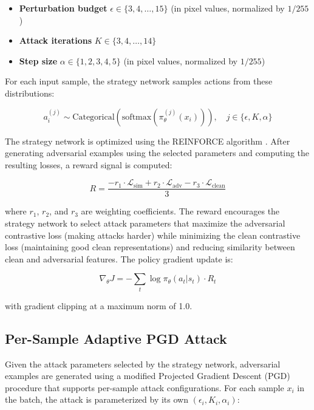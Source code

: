 \documentclass[conference]{IEEEtran}
\begin{document}
\begin{itemize}
    \item \textbf{Perturbation budget} $\epsilon \in \{3, 4, \ldots, 15\}$ (in pixel values, normalized by $1/255$)
    \item \textbf{Attack iterations} $K \in \{3, 4, \ldots, 14\}$
    \item \textbf{Step size} $\alpha \in \{1, 2, 3, 4, 5\}$ (in pixel values, normalized by $1/255$)
\end{itemize}

For each input sample, the strategy network samples actions from these distributions:

\begin{equation}
a_i^{(j)} \sim \text{Categorical}(\text{softmax}(\pi_\theta^{(j)}(x_i))), \quad j \in \{\epsilon, K, \alpha\}
\end{equation}

The strategy network is optimized using the REINFORCE algorithm \cite{b13}. After generating adversarial examples using the selected parameters and computing the resulting losses, a reward signal is computed:

\begin{equation}
R = \frac{-r_1 \cdot \mathcal{L}_{\text{sim}} + r_2 \cdot \mathcal{L}_{\text{adv}} - r_3 \cdot \mathcal{L}_{\text{clean}}}{3}
\end{equation}

\noindent where $r_1$, $r_2$, and $r_3$ are weighting coefficients. The reward encourages the strategy network to select attack parameters that maximize the adversarial contrastive loss (making attacks harder) while minimizing the clean contrastive loss (maintaining good clean representations) and reducing similarity between clean and adversarial features. The policy gradient update is:

\begin{equation}
\nabla_\theta J = -\sum_{t} \log \pi_\theta(a_t | s_t) \cdot R_t
\end{equation}

\noindent with gradient clipping at a maximum norm of 1.0.

\subsection{Per-Sample Adaptive PGD Attack}

Given the attack parameters selected by the strategy network, adversarial examples are generated using a modified Projected Gradient Descent (PGD) procedure that supports per-sample attack configurations. For each sample $x_i$ in the batch, the attack is parameterized by its own $(\epsilon_i, K_i, \alpha_i)$:
\end{document}
